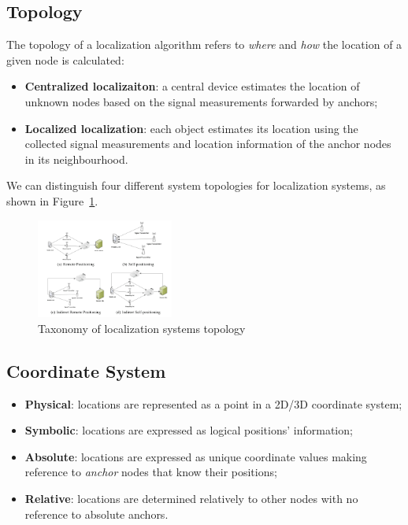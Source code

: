 \documentclass[a4paper,12pt]{article}
\begin{document}
\subsection{Topology}
The topology of a localization algorithm refers to \textit{where} and \textit{how} the location of a given node is calculated:

\begin{itemize}
	\item \textbf{Centralized localizaiton}: a central device estimates the location of unknown nodes based on the signal measurements forwarded by anchors;
	\item \textbf{Localized localization}: each object estimates its location using the collected signal measurements and location information of the anchor nodes in its neighbourhood.
\end{itemize}

We can distinguish four different system topologies for localization systems, as shown in Figure~\ref{fig:topology}.
\begin{figure}[H]
	\centering
  	\includegraphics[width=0.4\textwidth]{img/topology}
  	\caption{\label{fig:topology}Taxonomy of localization systems topology}
\end{figure}

\subsection{Coordinate System}
\begin{itemize}
  \item \textbf{Physical}: locations are represented as a point in a 2D/3D coordinate system;
  \item \textbf{Symbolic}: locations are expressed as logical positions’ information;
  \item \textbf{Absolute}: locations are expressed as unique coordinate values making reference to \textit{anchor} nodes that know their positions;
  \item \textbf{Relative}: locations are determined relatively to other nodes with no reference to absolute anchors.
\end{itemize}
\end{document}
